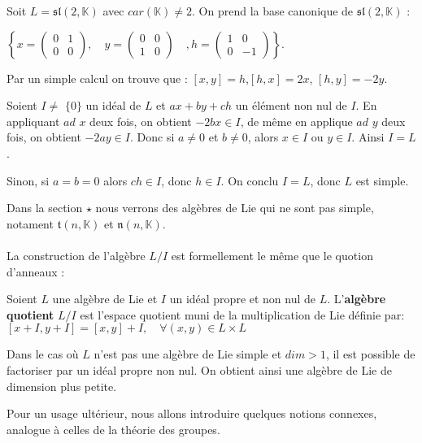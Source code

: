 \documentclass[a4paper,openany,12pt]{report}
\newcommand{\KK}{\mathbb{K}}
\newcommand{\ssl}{\mathfrak{sl}}
\newcommand{\ttt}{\mathfrak{t}}
\newcommand{\nn}{\mathfrak{n}}
\theoremstyle{break}
{\theorembodyfont{\upshape}
\newtheorem*{rmq}{Remarque :}
\newtheorem*{prv}{Preuve :}
\newtheorem*{ex}{Exemples :}
\newtheorem{exe}{Exemple : }
\newtheorem*{nota}{Notation :}}
\begin{document}
\begin{exe}
\quad Soit $L = \ssl(2,\KK)$ avec $car(\KK)\ne 2$. On prend la base canonique de $\ssl(2,\KK)$ : 
\begin{center}
$\left \{ x=\begin{pmatrix} 0 & 1\\ 0 & 0 \end{pmatrix},\quad y=\begin{pmatrix} 0 & 0\\ 1 & 0 \end{pmatrix}\quad, h=\begin{pmatrix} 1 & 0\\ 0 & -1 \end{pmatrix} \right \}$.
\end{center} 
Par un simple calcul on trouve que : $[x,y]=h$,\quad $[h,x]=2x$, \quad $[h,y]=-2y$.

Soient $I \ne$ $\{0 \}$ un idéal de $L$ et $ax+by+ch$ un élément non nul de $I$. En appliquant  $ad$ $x$ deux fois, on obtient $-2bx\in I$, de même en applique $ad$ $y$ deux fois, on obtient $-2ay\in I$. Donc si $a \ne 0$ et $b \ne 0$, alors $x \in I $ ou $y \in I$. Ainsi $I=L$.

Sinon, si $a = b = 0$ alors $ch \in I$, donc $h \in I$. On conclu $I=L$, donc $L$ est simple.
\end{exe}

Dans la section $\star$ nous verrons des algèbres de Lie qui ne sont pas simple, notament $\ttt(n,\KK)$ et $\nn(n,\KK)$.\\
\\
\quad La construction de l'algèbre $L/I$ est formellement le même que le quotion d'anneaux :

\begin{df}
\quad Soient $L$ une algèbre de Lie et $I$ un idéal propre et non nul de $L$. L'\textbf{algèbre quotient} $L/I$ est l'espace quotient muni de la multiplication de Lie définie par:
\center $[x+I, y+I]=[x, y]+I, \quad \forall(x, y) \in L \times L$
\end{df}

\begin{rmq}
\quad Dans le cas où $L$ n'est pas une algèbre de Lie simple et $dim>1$, il est possible de factoriser par un idéal propre non nul. On obtient ainsi une algèbre de Lie de dimension plus petite.
\end{rmq}

Pour un usage ultérieur, nous allons introduire quelques notions connexes, analogue à celles de la théorie des groupes.
\end{document}
